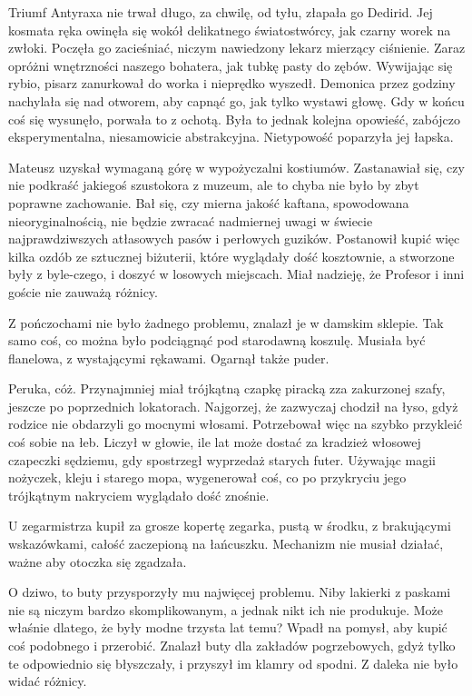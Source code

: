 Triumf Antyraxa nie trwał długo, za chwilę, od tyłu, złapała go Dedirid.
Jej kosmata ręka owinęła się wokół delikatnego światostwórcy, jak czarny worek na zwłoki.
Poczęła go zacieśniać, niczym nawiedzony lekarz mierzący ciśnienie.
Zaraz opróżni wnętrzności naszego bohatera, jak tubkę pasty do zębów.
Wywijając się rybio, pisarz zanurkował do worka i nieprędko wyszedł.
Demonica przez godziny nachylała się nad otworem, aby capnąć go, jak tylko wystawi głowę.
Gdy w końcu coś się wysunęło, porwała to z ochotą.
Była to jednak kolejna opowieść, zabójczo eksperymentalna, niesamowicie abstrakcyjna.
Nietypowość poparzyła jej łapska.

\divider{}

Mateusz uzyskał wymaganą górę w wypożyczalni kostiumów.
Zastanawiał się, czy nie podkraść jakiegoś szustokora z muzeum, ale to chyba nie było by zbyt poprawne zachowanie.
Bał się, czy mierna jakość kaftana, spowodowana nieoryginalnością, nie będzie zwracać nadmiernej uwagi w świecie najprawdziwszych atłasowych pasów i perłowych guzików.
Postanowił kupić więc kilka ozdób ze sztucznej biżuterii, które wyglądały dość kosztownie, a stworzone były z byle-czego, i doszyć w losowych miejscach. 
Miał nadzieję, że Profesor i inni goście nie zauważą różnicy.

Z pończochami nie było żadnego problemu, znalazł je w damskim sklepie.
Tak samo coś, co można było podciągnąć pod starodawną koszulę.
Musiała być flanelowa, z wystającymi rękawami.
Ogarnął także puder.

Peruka, cóż. Przynajmniej miał trójkątną czapkę piracką zza zakurzonej szafy, jeszcze po poprzednich lokatorach.
Najgorzej, że zazwyczaj chodził na łyso, gdyż rodzice nie obdarzyli go mocnymi włosami.
Potrzebował więc na szybko przykleić coś sobie na łeb.
Liczył w głowie, ile lat może dostać za kradzież włosowej czapeczki sędziemu, gdy spostrzegł wyprzedaż starych futer.
Używając magii nożyczek, kleju i starego mopa, wygenerował coś, co po przykryciu jego trójkątnym nakryciem wyglądało dość znośnie.

U zegarmistrza kupił za grosze kopertę zegarka, pustą w środku, z brakującymi wskazówkami, całość zaczepioną na łańcuszku.
Mechanizm nie musiał działać, ważne aby otoczka się zgadzała.

O dziwo, to buty przysporzyły mu najwięcej problemu.
Niby lakierki z paskami nie są niczym bardzo skomplikowanym, a jednak nikt ich nie produkuje.
Może właśnie dlatego, że były modne trzysta lat temu?
Wpadł na pomysł, aby kupić coś podobnego i przerobić.
Znalazł buty dla zakładów pogrzebowych, gdyż tylko te odpowiednio się błyszczały, i przyszył im klamry od spodni.
Z daleka nie było widać różnicy.

